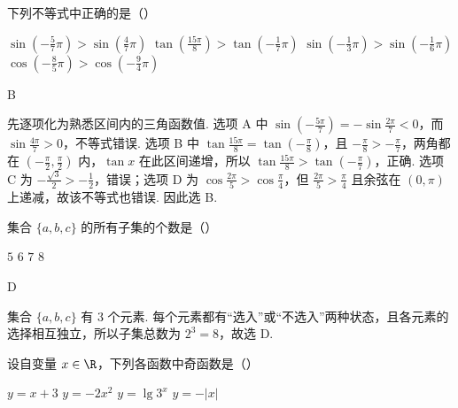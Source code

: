 \begin{problem}

下列不等式中正确的是（\quad）

\choices
    {\(\sin\left(-\frac{5}{7}\pi\right)>\sin\left(\frac{4}{7}\pi\right)\)}
    {\(\tan\left(\frac{15\pi}{8}\right)>\tan\left(-\frac{1}{7}\pi\right)\)}
    {\(\sin\left(-\frac{1}{3}\pi\right)>\sin\left(-\frac{1}{6}\pi\right)\)}
    {\(\cos\left(-\frac{8}{5}\pi\right)>\cos\left(-\frac{9}{4}\pi\right)\)}
\end{problem}

\begin{answer}
B
\end{answer}

\begin{solution}
先逐项化为熟悉区间内的三角函数值. 选项 A 中 \(\sin\left(-\frac{5\pi}{7}\right)=-\sin\frac{2\pi}{7}<0\)，而 \(\sin\frac{4\pi}{7}>0\)，不等式错误. 选项 B 中 \(\tan\frac{15\pi}{8}=\tan\left(-\frac{\pi}{8}\right)\)，且 \(-\frac{\pi}{8}>-\frac{\pi}{7}\)，两角都在 \(\left(-\frac{\pi}{2},\frac{\pi}{2}\right)\) 内，\(\tan x\) 在此区间递增，所以 \(\tan\frac{15\pi}{8}>\tan\left(-\frac{\pi}{7}\right)\)，正确. 选项 C 为 \(-\frac{\sqrt3}{2}>-\frac12\)，错误；选项 D 为 \(\cos\frac{2\pi}{5}>\cos\frac{\pi}{4}\)，但 \(\frac{2\pi}{5}>\frac{\pi}{4}\) 且余弦在 \((0,\pi)\) 上递减，故该不等式也错误. 因此选 B.
\end{solution}

\begin{problem}

集合 \(\{a, b, c\}\) 的所有子集的个数是（\quad）

\choices
    {\(5\)}
    {\(6\)}
    {\(7\)}
    {\(8\)}
\end{problem}

\begin{answer}
D
\end{answer}

\begin{solution}
集合 \(\{a,b,c\}\) 有 \(3\) 个元素. 每个元素都有“选入”或“不选入”两种状态，且各元素的选择相互独立，所以子集总数为 \(2^3=8\)，故选 D.
\end{solution}

\begin{problem}

设自变量 \(x \in \R\)，下列各函数中奇函数是（\quad）

\choices
    {\(y = x + 3 \)}
    {\(y = -2x^{2} \)}
    {\(y = \lg 3^x \)}
    {\(y = -|x| \)}
\end{problem}


